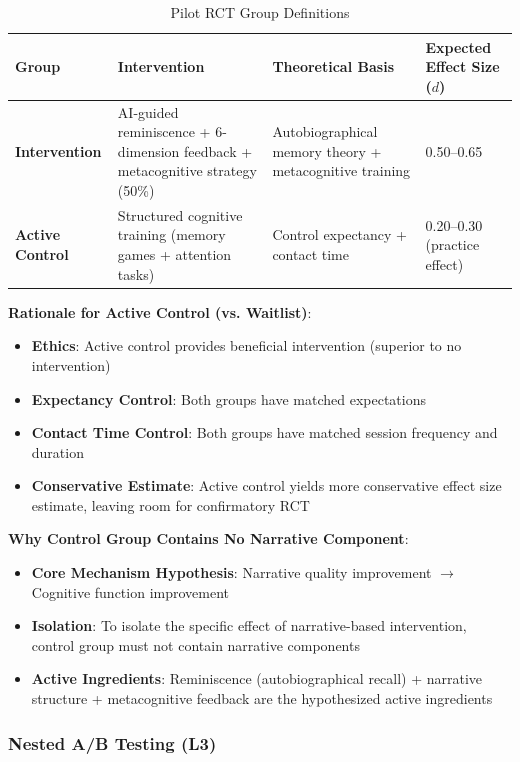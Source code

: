 \documentclass[11pt]{article}
\begin{document}
\begin{table}[h]
\centering
\caption{Pilot RCT Group Definitions}
\label{tab:rct-groups}
\begin{tabular}{llll}
\toprule
\textbf{Group} & \textbf{Intervention} & \textbf{Theoretical Basis} & \textbf{Expected Effect Size ($d$)} \\
\midrule
\textbf{Intervention} & AI-guided reminiscence + 6-dimension feedback + metacognitive strategy (50\%) & Autobiographical memory theory + metacognitive training & 0.50--0.65 \\
\textbf{Active Control} & Structured cognitive training (memory games + attention tasks) & Control expectancy + contact time & 0.20--0.30 (practice effect) \\
\bottomrule
\end{tabular}
\end{table}

\textbf{Rationale for Active Control (vs. Waitlist)}:
\begin{itemize}
    \item \textbf{Ethics}: Active control provides beneficial intervention (superior to no intervention)
    \item \textbf{Expectancy Control}: Both groups have matched expectations
    \item \textbf{Contact Time Control}: Both groups have matched session frequency and duration
    \item \textbf{Conservative Estimate}: Active control yields more conservative effect size estimate, leaving room for confirmatory RCT
\end{itemize}

\textbf{Why Control Group Contains No Narrative Component}:
\begin{itemize}
    \item \textbf{Core Mechanism Hypothesis}: Narrative quality improvement $\rightarrow$ Cognitive function improvement
    \item \textbf{Isolation}: To isolate the specific effect of narrative-based intervention, control group must not contain narrative components
    \item \textbf{Active Ingredients}: Reminiscence (autobiographical recall) + narrative structure + metacognitive feedback are the hypothesized active ingredients
\end{itemize}

\subsubsection{Nested A/B Testing (L3)}
\end{document}
